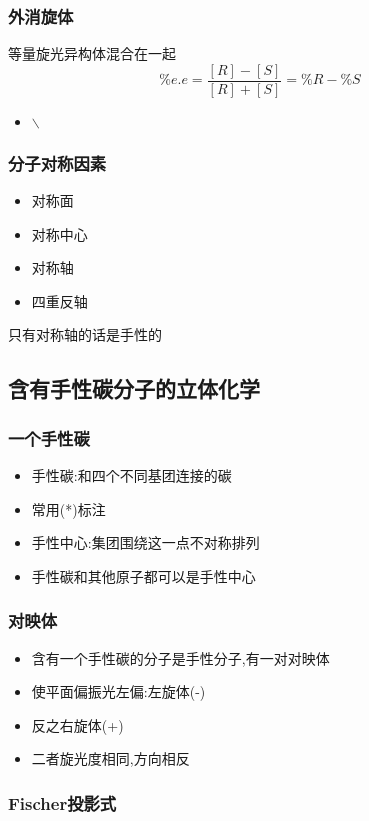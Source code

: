 \documentclass[11pt]{article}
\begin{document}
\subsubsection{外消旋体}
\label{sec:orgb5ba53e}
等量旋光异构体混合在一起
\[
\%e.e=\frac{[R]-[S]}{[R]+[S]} =\%R -\%S
\]
\begin{itemize}
\item $\backslash$%
\end{itemize}
\subsubsection{分子对称因素}
\label{sec:orgc31548a}
\begin{itemize}
\item 对称面
\item 对称中心
\item 对称轴
\item 四重反轴
\end{itemize}
只有对称轴的话是手性的
\subsection{含有手性碳分子的立体化学}
\label{sec:org2a2f882}
\subsubsection{一个手性碳}
\label{sec:orgddb2d63}
\begin{itemize}
\item 手性碳:和四个不同基团连接的碳
\item 常用(*)标注
\item 手性中心:集团围绕这一点不对称排列
\item 手性碳和其他原子都可以是手性中心
\end{itemize}
\subsubsection{对映体}
\label{sec:orgd7236d8}
\begin{itemize}
\item 含有一个手性碳的分子是手性分子,有一对对映体
\item 使平面偏振光左偏:左旋体(-)
\item 反之右旋体(+)
\item 二者旋光度相同,方向相反
\end{itemize}
\subsubsection{Fischer投影式}
\label{sec:org034d6a2}
\end{document}
